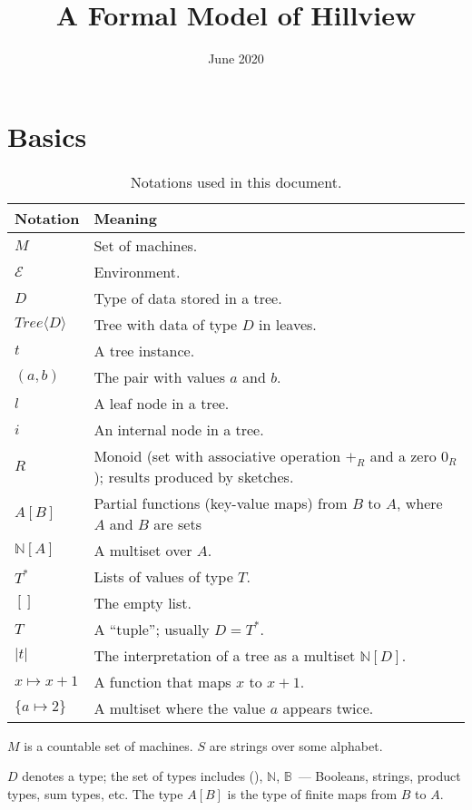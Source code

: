 \documentclass{article}
\title{A Formal Model of Hillview}
\date{June 2020}
\author{}
\newcommand{\tree}[1]{\mathit{Tree}\langle #1 \rangle}
\newcommand{\N}{\ensuremath{\mathbb{N}}\xspace}
\newcommand{\B}{\ensuremath{\mathbb{B}}\xspace}
\newcommand{\E}{\ensuremath{\mathcal{E}}\xspace}
\begin{document}
\maketitle

\section{Basics}

\begin{table}[h]
\begin{tabular}{ll}
  Notation & Meaning \\ \hline
  $M$ & Set of machines. \\
  \E & Environment. \\
  $D$ & Type of data stored in a tree. \\
  $\tree{D}$ & Tree with data of type $D$ in leaves. \\
  $t$ & A tree instance. \\
  $(a, b)$ & The pair with values $a$ and $b$. \\
  $l$ & A leaf node in a tree. \\
  $i$ & An internal node in a tree. \\
  $R$ & Monoid (set with associative operation $+_R$ and a zero $0_R$); results produced by sketches. \\
  $A[B]$ & Partial functions (key-value maps) from $B$ to $A$, where $A$ and $B$ are sets \\
  $\N[A]$ & A multiset over $A$. \\
  $T^*$ & Lists of values of type $T$. \\
  $[]$ & The empty list. \\
  $T$ & A ``tuple''; usually $D = T^*$. \\
  $|t|$ & The interpretation of a tree as a multiset $\N[D]$. \\
  $x \mapsto x + 1$ & A function that maps $x$ to $x + 1$. \\
  $\{ a \mapsto 2 \}$ & A multiset where the value $a$ appears twice. \\
  \hline
\end{tabular}
\caption{Notations used in this document.}
\end{table}

$M$ is a countable set of machines.  $S$ are strings over some alphabet.

$D$ denotes a type; the set of types includes (), \N, \B\ --- Booleans,
strings, product types, sum types, etc.  The type $A[B]$ is the type
of finite maps from $B$ to $A$.
\end{document}
